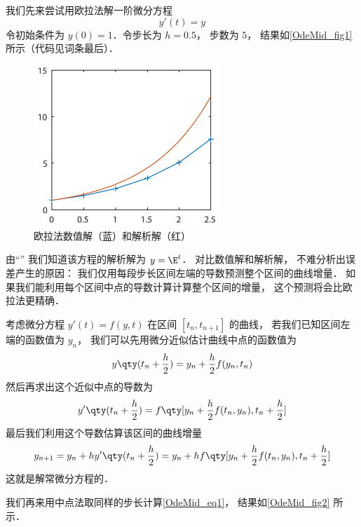 

我们先来尝试用欧拉法解一阶微分方程
\begin{equation}\label{OdeMid_eq1}
y'(t) = y
\end{equation}
令初始条件为 $y(0) = 1$．令步长为 $h = 0.5$， 步数为 $5$， 结果如\autoref{OdeMid_fig1} 所示（代码见词条最后）．

\begin{figure}[ht]
\centering
\includegraphics[width=7cm]{./figures/OdeMid.pdf}
\caption{欧拉法数值解（蓝）和解析解（红）} \label{OdeMid_fig1}
\end{figure}

由“”%
我们知道该方程的解析解为 $y = \E^{t}$． 对比数值解和解析解， 不难分析出误差产生的原因： 我们仅用每段步长区间左端的导数预测整个区间的曲线增量． 如果我们能利用每个区间中点的导数计算计算整个区间的增量， 这个预测将会比欧拉法更精确．

考虑微分方程 $y'(t) = f(y, t)$ 在区间 $[t_n, t_{n+1}]$ 的曲线， 若我们已知区间左端的函数值为 $y_n$， 我们可以先用微分近似估计曲线中点的函数值为
\begin{equation}
y \qty(t_n + \frac h2) = y_n + \frac h2 f(y_n, t_n)
\end{equation}
然后再求出这个近似中点的导数为
\begin{equation}
y' \qty(t_n + \frac h2) = f \qty[y_n + \frac h2 f(t_n, y_n), t_n + \frac h2]
\end{equation}
最后我们利用这个导数估算该区间的曲线增量
\begin{equation}
y_{n+1} = y_n + hy' \qty(t_n + \frac h2) = y_n + h f \qty[y_n + \frac h2 f(t_n, y_n), t_n + \frac h2]
\end{equation}
这就是解常微分方程的．

我们再来用中点法取同样的步长计算\autoref{OdeMid_eq1}， 结果如\autoref{OdeMid_fig2} 所示．

